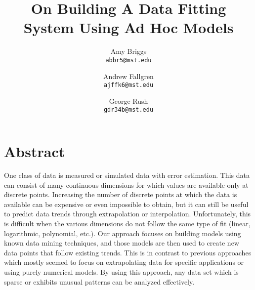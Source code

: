\documentclass[12pt,a4paper]{report}
\author{
    Amy Briggs \\
    \texttt{abbr5@mst.edu}
    \and
    Andrew Fallgren \\
    \texttt{ajffk6@mst.edu}
    \and
    George Rush \\
    \texttt{gdr34b@mst.edu}
}
\title{On Building A Data Fitting System Using Ad Hoc Models}
\begin{document}
\maketitle

\pagebreak
\section{Abstract}
One class of data is measured or simulated data with error estimation. This data can consist of many continuous dimensions for which values are available only at discrete points. Increasing the number of discrete points at which the data is available can be expensive or even impossible to obtain, but it can still be useful to predict data trends through extrapolation or interpolation. Unfortunately, this is difficult when the various dimensions do not follow the same type of fit (linear, logarithmic, polynomial, etc.). Our approach focuses on building models using known data mining techniques, and those models are then used to create new data points that follow existing trends. This is in contrast to previous approaches which mostly seemed to focus on extrapolating data for specific applications or using purely numerical models. By using this approach, any data set which is sparse or exhibits unusual patterns can be analyzed effectively.
\end{document}
